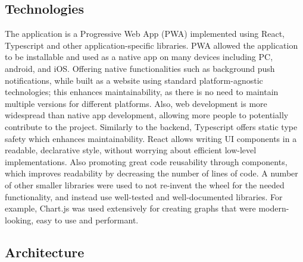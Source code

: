 \subsection{Technologies}
The application is a Progressive Web App (PWA) implemented using React, Typescript and other application-specific libraries. PWA allowed the application to be installable and used as a native app on many devices including PC, android, and iOS. Offering native functionalities such as background push notifications, while built as a website using standard platform-agnostic technologies; this enhances maintainability, as there is no need to maintain multiple versions for different platforms. Also, web development is more widespread than native app development, allowing more people to potentially contribute to the project. Similarly to the backend, Typescript offers static type safety which enhances maintainability. React allows writing UI components in a readable, declarative style, without worrying about efficient low-level implementations. Also promoting great code reusability through components, which improves readability by decreasing the number of lines of code. A number of other smaller libraries were used to not re-invent the wheel for the needed functionality, and instead use well-tested and well-documented libraries. For example, Chart.js was used extensively for creating graphs that were modern-looking, easy to use and performant. 
\subsection{Architecture}

